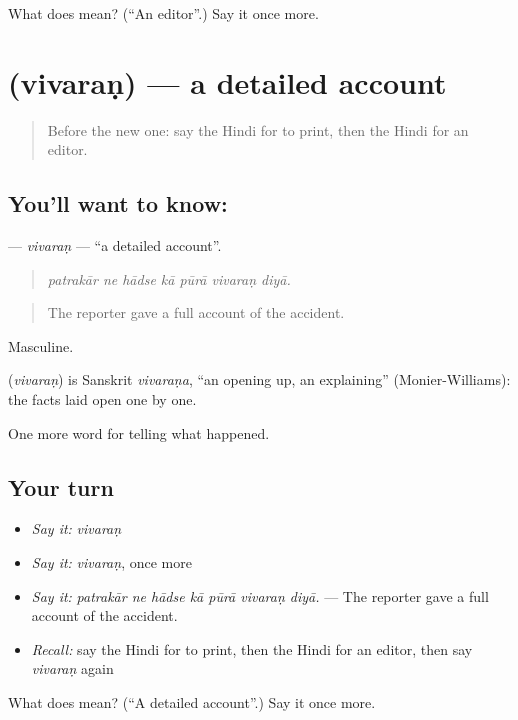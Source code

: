 \begin{tcolorbox}[breakable,colback=teal!4,colframe=teal!35!black,title={Before you move on}]
What does  mean? (\textquotedblleft{}An editor\textquotedblright{}.) Say it once more.
\end{tcolorbox}
\section[\texorpdfstring{\hi{विवरण} (vivaraṇ)}{विवरण (vivaraṇ)}]{ (vivaraṇ) — a detailed account}

\label{lesson:HI-C313-vivaran}



\begin{quote}
Before the new one: say the Hindi for to print, then the Hindi for an editor.
\end{quote}

\subsection*{You'll want to know: }
\textbf{} — \emph{vivaraṇ} — \textquotedblleft{}a detailed account\textquotedblright{}.

\begin{quote}
      
\end{quote}

\begin{quote}
\emph{patrakār ne hādse kā pūrā vivaraṇ diyā.}
\end{quote}

\begin{quote}
The reporter gave a full account of the accident.
\end{quote}

Masculine.

\begin{cousinweb}
\textbf{} (\emph{vivaraṇ}) is Sanskrit \emph{vivaraṇa}, \textquotedblleft{}an opening up, an explaining\textquotedblright{} (Monier-Williams): the facts laid open one by one.
\end{cousinweb}

\begin{grammarlens}[title={What you've built}]
One more word for telling what happened.
\end{grammarlens}

\subsection*{Your turn}
\begin{itemize}
\raggedright
  \item \emph{Say it:} \emph{vivaraṇ}
  \item \emph{Say it:} \emph{vivaraṇ}, once more
  \item \emph{Say it:} \emph{patrakār ne hādse kā pūrā vivaraṇ diyā.} — The reporter gave a full account of the accident.
  \item \emph{Recall:} say the Hindi for to print, then the Hindi for an editor, then say \emph{vivaraṇ} again
\end{itemize}

\begin{tcolorbox}[breakable,colback=teal!4,colframe=teal!35!black,title={Before you move on}]
What does  mean? (\textquotedblleft{}A detailed account\textquotedblright{}.) Say it once more.
\end{tcolorbox}
